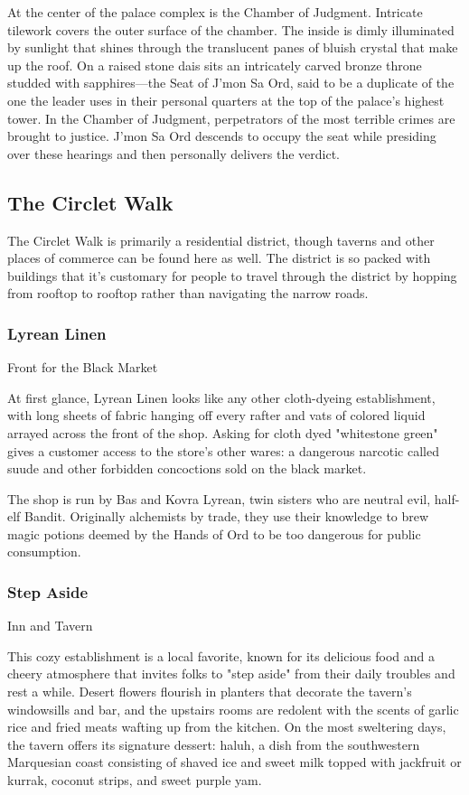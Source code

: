 \documentclass[10pt,a4paper,twoside,twocolumn,openany,nodeprecatedcode]{dndbook}
\begin{document}
At the center of the palace complex is the Chamber of Judgment. Intricate tilework covers the outer surface of the chamber. The inside is dimly illuminated by sunlight that shines through the translucent panes of bluish crystal that make up the roof. On a raised stone dais sits an intricately carved bronze throne studded with sapphires—the Seat of J'mon Sa Ord, said to be a duplicate of the one the leader uses in their personal quarters at the top of the palace's highest tower. In the Chamber of Judgment, perpetrators of the most terrible crimes are brought to justice. J'mon Sa Ord descends to occupy the seat while presiding over these hearings and then personally delivers the verdict.

\subsection{The Circlet Walk}
The Circlet Walk is primarily a residential district, though taverns and other places of commerce can be found here as well. The district is so packed with buildings that it's customary for people to travel through the district by hopping from rooftop to rooftop rather than navigating the narrow roads.

\subsubsection{Lyrean Linen}
Front for the Black Market

At first glance, Lyrean Linen looks like any other cloth-dyeing establishment, with long sheets of fabric hanging off every rafter and vats of colored liquid arrayed across the front of the shop. Asking for cloth dyed "whitestone green" gives a customer access to the store's other wares: a dangerous narcotic called suude and other forbidden concoctions sold on the black market.

The shop is run by Bas and Kovra Lyrean, twin sisters who are neutral evil, half-elf Bandit. Originally alchemists by trade, they use their knowledge to brew magic potions deemed by the Hands of Ord to be too dangerous for public consumption.

\subsubsection{Step Aside}
Inn and Tavern

This cozy establishment is a local favorite, known for its delicious food and a cheery atmosphere that invites folks to "step aside" from their daily troubles and rest a while. Desert flowers flourish in planters that decorate the tavern's windowsills and bar, and the upstairs rooms are redolent with the scents of garlic rice and fried meats wafting up from the kitchen. On the most sweltering days, the tavern offers its signature dessert: haluh, a dish from the southwestern Marquesian coast consisting of shaved ice and sweet milk topped with jackfruit or kurrak, coconut strips, and sweet purple yam.
\end{document}
